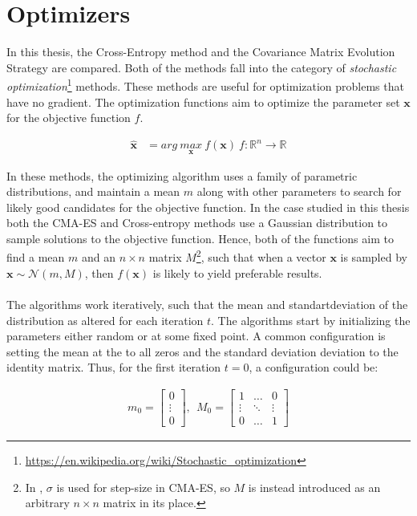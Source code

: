 \section{Optimizers}

In this thesis, the Cross-Entropy method and the Covariance Matrix Evolution 
Strategy are compared. Both of the methods fall into the category of 
\textit{stochastic optimization}\footnote{\url{https://en.wikipedia.org/wiki/Stochastic_optimization}}
methods. These methods are useful for optimization problems that have no gradient.
The optimization functions aim to optimize the parameter set $\textbf{x}$
for the objective function $f$.

\begin{align*}
\hat{\textbf{x}} &= arg \  \underset{\textbf{x}}{max} \  f(\textbf{x}) \ f : \mathbb{R}^{n} \rightarrow \mathbb{R}
\end{align*}

In these methods, the optimizing algorithm uses a family of parametric distributions,
and maintain a mean $m$ along with other parameters
to search for likely good candidates for the objective function.  In the case studied in this thesis
both the CMA-ES and Cross-entropy methods use a Gaussian distribution to sample solutions to the objective function.
Hence, both of the functions aim to find a mean $m$ and an $n \times n$ matrix 
$M$\footnote{In \citep{hansen2011}, $\sigma$ is used for step-size in CMA-ES, so $M$ is instead introduced
as an arbitrary $n \times n$ matrix in its place.}, such that when
a vector $\textbf{x}$ is sampled by $\textbf{x} \sim \mathcal{N}\left( m, M \right)$, then $f(\textbf{x})$ 
is likely to yield preferable results.\\
\\
The algorithms work iteratively, such that the mean and standartdeviation of the distribution 
as altered for each iteration $t$.
The algorithms start by initializing the parameters either random or at some fixed point. A common 
configuration is setting the mean at the to all zeros and the standard deviation deviation to the identity matrix.
Thus, for the first iteration $t = 0$, a configuration could be:

\begin{align*}
m_{0} =
\begin{bmatrix}
0\\
\vdots\\
0
\end{bmatrix},\ \ 
M_{0} = 
\begin{bmatrix}
1 & \hdots & 0\\
\vdots & \ddots & \vdots\\
0 & \hdots & 1
\end{bmatrix}
\end{align*}

